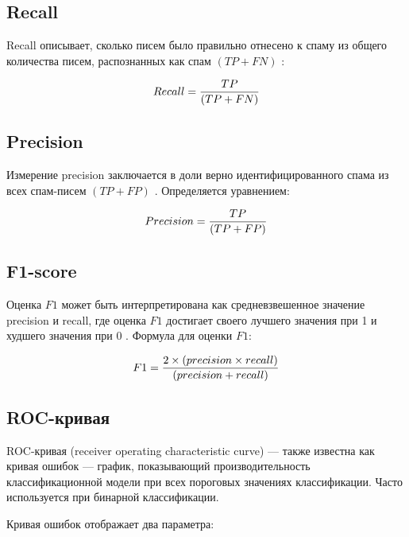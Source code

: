 \subsection{Recall}

Recall описывает, сколько писем было правильно отнесено к спаму из
общего количества писем, распознанных как спам $(TP + FN)$ \cite{scikitMetrics}:

\begin{equation}\label{eq12}
    Recall = {{TP} \over{(TP + FN)}}
\end{equation}

\subsection{Precision}

Измерение precision заключается в доли верно идентифицированного
спама из всех спам-писем $(TP + FP)$ \cite{scikitMetrics}. Определяется
уравнением:

\begin{equation}\label{eq13}
    Precision = {{TP} \over{(TP + FP)}}
\end{equation}

\subsection{F1-score}

Оценка $F1$ может быть интерпретирована как средневзвешенное
значение precision и recall, где оценка $F1$ достигает своего лучшего
значения при 1 и худшего значения при 0 \cite{scikitMetrics}.
Формула для оценки $F1$:

\begin{equation}\label{eq14}
    F1 = {2 \times (precision \times recall) \over{(precision + recall)}}
\end{equation}


\subsection{ROC-кривая} 

ROC-кривая (receiver operating characteristic curve) — также известна как кривая ошибок — график, показывающий 
производительность классификационной модели при всех пороговых значениях классификации. 
Часто используется при бинарной классификации. 

Кривая ошибок отображает два параметра:

